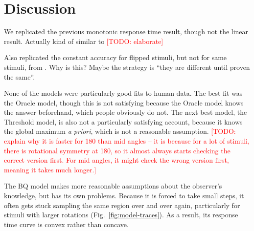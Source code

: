 \documentclass[10pt,letterpaper]{article}
\newcommand{\TODO}[1]{\textcolor{red}{[TODO: #1]}}
\newcommand{\Oc}[0]{Oracle}
\newcommand{\Th}[0]{Threshold}
\newcommand{\Hc}[0]{HC}
\newcommand{\Bq}[0]{BQ}
\begin{document}

\begin{figure*}[t]
  \begin{center}
    \caption{}
    \label{fig:response-time-corrs}
  \end{center}
\end{figure*}

\section{Discussion}

We replicated the previous monotonic response time result, though not
the linear result. Actually kind of similar to \cite{Gardony:2013gn}
\TODO{elaborate}

Also replicated the constant accuracy for flipped stimuli, but not for
same stimuli, from \cite{Cooper:1975wp}. Why is this? Maybe the
strategy is ``they are different until proven the same''.

None of the models were particularly good fits to human data. The best
fit was the \Oc{} model, though this is not satisfying because the
\Oc{} model knows the answer beforehand, which people obviously do
not. The next best model, the \Th{} model, is also not a
particularly satisfying account, because it knows the global maximum
\textit{a priori}, which is not a reasonable assumption. \TODO{explain
  why it is faster for 180 than mid angles -- it is because for a lot
  of stimuli, there is rotational symmetry at 180, so it almost always
  starts checking the correct version first. For mid angles, it might
  check the wrong version first, meaning it takes much longer.}

The \Bq{} model makes more reasonable assumptions about the observer's
knowledge, but has its own problems. Because it is forced to take
small steps, it often gets stuck sampling the same region over and
over again, particularly for stimuli with larger rotations
(Fig.~\ref{fig:model-traces}). As a result, its response time curve is
convex rather than concave.
\end{document}
